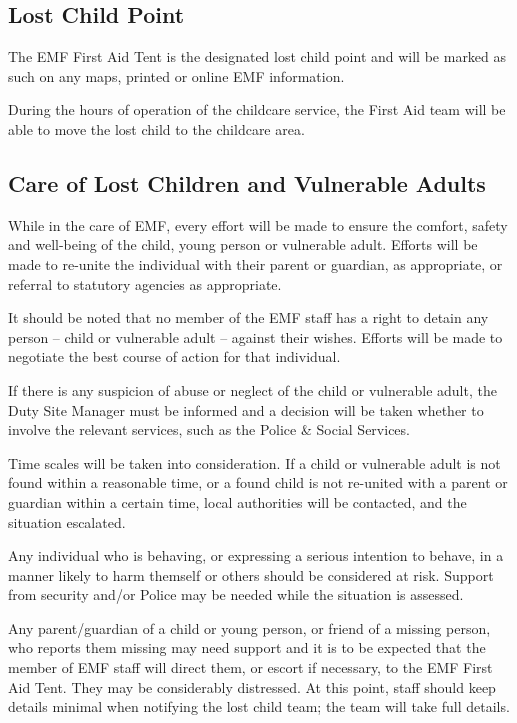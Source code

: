 \subsection{Lost Child Point}
The EMF First Aid Tent is the designated lost child point and will be marked as
such on any maps, printed or online EMF information.

During the hours of operation of the childcare service, the First Aid team
will be able to move the lost child to the childcare area.

\subsection{Care of Lost Children and Vulnerable Adults}

While in the care of EMF, every effort will be made to
ensure the comfort, safety and well-being of the child, young person or
vulnerable adult. Efforts will be made to re-unite the
individual with their parent or guardian, as appropriate, or referral to
statutory agencies as appropriate.

It should be noted that no member of the EMF staff has a right to detain any
person -- child or vulnerable adult -- against their wishes. Efforts will 
be made to negotiate the best course of action for that individual.

If there is any suspicion of abuse or neglect of the child or vulnerable adult,
the Duty Site Manager must be informed and a decision will be taken whether to
involve the relevant services, such as the Police \& Social Services.

Time scales will be taken into consideration. If a child or vulnerable adult is
not found within a reasonable time, or a found child is not re-united with a
parent or guardian within a certain time, local authorities will be contacted,
and the situation escalated.

Any individual who is behaving, or expressing a serious intention to behave, in
a manner likely to harm themself or others should be considered at risk.
Support from security and/or Police may be needed while the situation is
assessed.

Any parent/guardian of a child or young person, or friend of a missing person,
who reports them missing may need support and it is to be expected that the
member of EMF staff will direct them, or escort if necessary, to the EMF First
Aid Tent. They may be considerably distressed. At this point, staff should keep
details minimal when notifying the lost child team; the team will take full
details.

